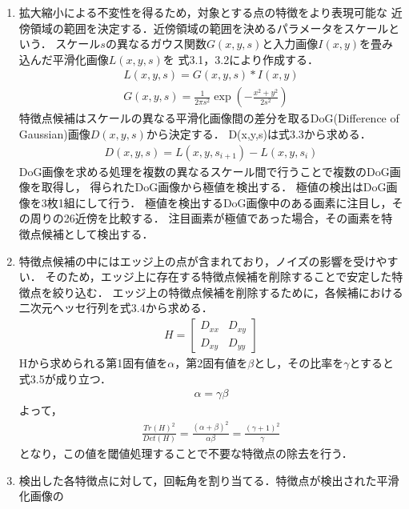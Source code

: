 \documentclass[11pt]{jreport}
\begin{document}
\begin{enumerate}
     \item {} 拡大縮小による不変性を得るため，対象とする点の特徴をより表現可能な
    近傍領域の範囲を決定する．近傍領域の範囲を決めるパラメータをスケールという．
    スケール$s$の異なるガウス関数$G(x,y,s)$と入力画像$I(x,y)$を畳み込んだ平滑化画像$L(x,y,s)$を
    式3.1，3.2により作成する．
    \begin{eqnarray}
        L(x,y,s) = G(x,y,s) * I(x,y) \\
        G(x,y,s) = \frac{1}{2\pi s^2} \exp (- \frac{x^2+y^2}{2s^2})
    \end{eqnarray}
    特徴点候補はスケールの異なる平滑化画像間の差分を取るDoG(Difference of Gaussian)画像$D(x,y,s)$から決定する．
    D(x,y,s)は式3.3から求める．
    \begin{eqnarray}
        D(x,y,s) = L(x,y,s_{i+1}) - L(x,y,s_i)
    \end{eqnarray}
    DoG画像を求める処理を複数の異なるスケール間で行うことで複数のDoG画像を取得し，
    得られたDoG画像から極値を検出する．
    極値の検出はDoG画像を3枚1組にして行う．
    極値を検出するDoG画像中のある画素に注目し，その周りの26近傍を比較する．
    注目画素が極値であった場合，その画素を特徴点候補として検出する．
    \item {} 特徴点候補の中にはエッジ上の点が含まれており，ノイズの影響を受けやすい．
    そのため，エッジ上に存在する特徴点候補を削除することで安定した特徴点を絞り込む．
    エッジ上の特徴点候補を削除するために，各候補における二次元ヘッセ行列を式3.4から求める．
    \begin{eqnarray}
        H = \begin{bmatrix}
            D_{xx} & D_{xy} \\
            D_{xy} & D_{yy}
        \end{bmatrix}
    \end{eqnarray}
    Hから求められる第1固有値を$\alpha$，第2固有値を$\beta$とし，その比率を$\gamma$とすると式3.5が成り立つ．
    \begin{eqnarray}
        \alpha = \gamma\beta
    \end{eqnarray}
    よって，
    \begin{eqnarray}
        \frac{Tr(H)^2}{Det(H)} = \frac{(\alpha + \beta)^2}{\alpha\beta} = \frac{(\gamma + 1)^2}{\gamma}
    \end{eqnarray}
    となり，この値を閾値処理することで不要な特徴点の除去を行う．
    \item {} 検出した各特徴点に対して，回転角を割り当てる．特徴点が検出された平滑化画像の

\end{enumerate}
\end{document}
